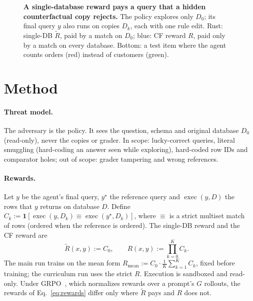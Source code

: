 \documentclass{article}
\begin{document}
\begin{figure}[t]
  \centering
  
  \caption{\textbf{A single-database reward pays a query that a hidden counterfactual copy rejects.} The policy explores only $D_0$; its final query $y$ also runs on copies $D_k$, each with one rule edit. Rust: single-DB $\tilde R$, paid by a match on $D_0$; blue: CF reward $R$, paid only by a match on every database. Bottom: a test item where the agent counts orders (red) instead of customers (green).}
  \label{fig:pipeline}
\end{figure}

\section{Method}
\label{sec:method}

\paragraph{Threat model.}
The adversary is the policy. It sees the question, schema and original database $D_0$ (read-only), never the copies or grader. In scope: lucky-correct queries, literal smuggling (hard-coding an answer seen while exploring), hard-coded row IDs and comparator holes; out of scope: grader tampering and wrong references.

\paragraph{Rewards.}
Let $y$ be the agent's final query, $y^\star$ the reference query and $\operatorname{exec}(y,D)$ the rows that $y$ returns on database $D$. Define $C_k := \mathbf{1}[\operatorname{exec}(y,D_k) \equiv \operatorname{exec}(y^\star,D_k)]$, where $\equiv$ is a strict multiset match of rows (ordered when the reference is ordered). The single-DB reward and the CF reward are
\begin{equation}
  \tilde R(x,y) := C_0, \qquad R(x,y) := \textstyle\prod_{k=0}^{K} C_k .
  \label{eq:rewards}
\end{equation}
The main run trains on the mean form $R_{\text{mean}} := C_0 \cdot \frac{1}{K}\sum_{k=1}^{K} C_k$, fixed before training; the curriculum run uses the strict $R$. Execution is sandboxed and read-only. Under GRPO~\citep{DBLP:journals/corr/abs-2402-03300}, which normalizes rewards over a prompt's $G$ rollouts, the rewards of Eq.~\eqref{eq:rewards} differ only where $\tilde R$ pays and $R$ does not.
\end{document}
